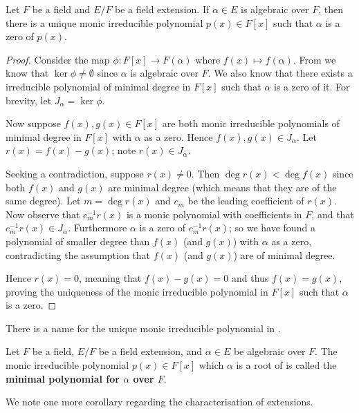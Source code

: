 \begin{corollary}\label{corollary-unique-minimal-polynomial}
    Let $F$ be a field and $E/F$ be a field extension. If $\alpha \in E$ is algebraic over $F$, then there is a unique monic irreducible polynomial $p(x) \in F[x]$ such that $\alpha$ is a zero of $p(x)$.
\end{corollary}
\begin{proof}
    Consider the map $\phi: F[x] \to F(\alpha)$ where $f(x) \mapsto f(\alpha)$. From  we know that $\ker\phi \neq \emptyset$ since $\alpha$ is algebraic over $F$. We also know that there exists a irreducible polynomial of minimal degree in $F[x]$ such that $\alpha$ is a zero of it. For brevity, let $J_\alpha = \ker\phi$.

    Now suppose $f(x), g(x) \in F[x]$ are both monic irreducible polynomials of minimal degree in $F[x]$ with $\alpha$ as a zero. Hence $f(x), g(x) \in J_\alpha$. Let $r(x) = f(x) - g(x)$; note $r(x) \in J_\alpha$. 
    
    Seeking a contradiction, suppose $r(x) \neq 0$. Then $\deg r(x) < \deg f(x)$ since both $f(x)$ and $g(x)$ are minimal degree (which means that they are of the same degree). Let $m = \deg r(x)$ and $c_m$ be the leading coefficient of $r(x)$. Now observe that $c_m^{-1}r(x)$ is a monic polynomial with coefficients in $F$, and that $c_m^{-1}r(x) \in J_\alpha$. Furthermore $\alpha$ is a zero of $c_m^{-1}r(x)$; so we have found a polynomial of smaller degree than $f(x)$ (and $g(x)$) with $\alpha$ as a zero, contradicting the assumption that $f(x)$ (and $g(x)$) are of minimal degree.

    Hence $r(x) = 0$, meaning that $f(x) - g(x) = 0$ and thus $f(x) = g(x)$, proving the uniqueness of the monic irreducible polynomial in $F[x]$ such that $\alpha$ is a zero.
\end{proof}

There is a name for the unique monic irreducible polynomial in .

\begin{definition}
    Let $F$ be a field, $E/F$ be a field extension, and $\alpha \in E$ be algebraic over $F$. The monic irreducible polynomial $p(x) \in F[x]$ which $\alpha$ is a root of is called the \textbf{minimal polynomial for $\alpha$ over $F$}.
\end{definition}

We note one more corollary regarding the characterisation of extensions.

